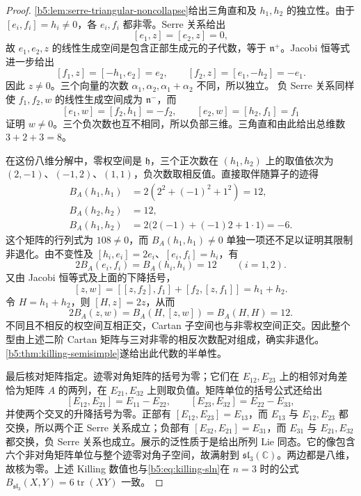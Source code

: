 \begin{proof}
	\cref{b5:lem:serre-triangular-noncollapse}给出三角直和及 \(h_1,h_2\) 的独立性。由于 \([e_i,f_i]=h_i\ne0\)，各 \(e_i,f_i\) 都非零。Serre 关系给出
	\[
		[e_1,z]=[e_2,z]=0,
	\]
	故 \(e_1,e_2,z\) 的线性生成空间是包含正部生成元的子代数，等于 \(\mathfrak n^+\)。Jacobi 恒等式进一步给出
	\[
		[f_1,z]=[-h_1,e_2]=e_2,\qquad [f_2,z]=[e_1,-h_2]=-e_1.
	\]
	因此 \(z\ne0\)。三个向量的次数 \(\alpha_1,\alpha_2,\alpha_1+\alpha_2\) 不同，所以独立。 负 Serre 关系同样使 \(f_1,f_2,w\) 的线性生成空间成为 \(\mathfrak n^-\)，而
	\[
		[e_1,w]=[f_2,h_1]=-f_2,\qquad [e_2,w]=[h_2,f_1]=f_1
	\]
	证明 \(w\ne0\)。三个负次数也互不相同，所以负部三维。三角直和由此给出总维数 \(3+2+3=8\)。

	在这份八维分解中，零权空间是 \(\mathfrak h\)，三个正次数在 \((h_1,h_2)\) 上的取值依次为 \((2,-1)\)、\((-1,2)\)、\((1,1)\)，负次数取相反值。直接取伴随算子的迹得
	\[
		\begin{aligned}
			B_A(h_1,h_1)&=2(2^2+(-1)^2+1^2)=12,\\
			B_A(h_2,h_2)&=12,\\
			B_A(h_1,h_2)&=2\bigl(2(-1)+(-1)2+1\cdot1\bigr)=-6.
		\end{aligned}
	\]
	这个矩阵的行列式为 \(108\ne0\)，而 \(B_A(h_1,h_1)\ne0\) 单独一项还不足以证明其限制非退化。由不变性及 \([h_i,e_i]=2e_i\)、\([e_i,f_i]=h_i\)，有
	\[
		2B_A(e_i,f_i)=B_A(h_i,h_i)=12\qquad(i=1,2).
	\]
	又由 Jacobi 恒等式及上面的下降括号，
	\[
		[z,w]=[[z,f_2],f_1]+[f_2,[z,f_1]]=h_1+h_2.
	\]
	令 \(H=h_1+h_2\)，则 \([H,z]=2z\)，从而
	\[
		2B_A(z,w)=B_A(H,[z,w])=B_A(H,H)=12.
	\]
	不同且不相反的权空间互相正交，Cartan 子空间也与非零权空间正交。因此整个型由上述二阶 Cartan 矩阵与三对非零的相反次数配对组成，确实非退化。\cref{b5:thm:killing-semisimple}遂给出此代数的半单性。

	最后核对矩阵指定。迹零对角矩阵的括号为零；它们在 \(E_{12},E_{23}\) 上的相邻对角差恰为矩阵 \(A\) 的两列，在 \(E_{21},E_{32}\) 上则取负值。矩阵单位的括号公式还给出
	\[
		[E_{12},E_{21}]=E_{11}-E_{22},\qquad [E_{23},E_{32}]=E_{22}-E_{33},
	\]
	并使两个交叉的升降括号为零。正部有 \([E_{12},E_{23}]=E_{13}\)，而 \(E_{13}\) 与 \(E_{12},E_{23}\) 都交换，所以两个正 Serre 关系成立；负部有 \([E_{32},E_{21}]=E_{31}\)，而 \(E_{31}\) 与 \(E_{21},E_{32}\) 都交换，负 Serre 关系也成立。展示的泛性质于是给出所列 Lie 同态。它的像包含六个非对角矩阵单位与整个迹零对角子空间，故满射到 \(\mathfrak{sl}_3(\mathbb C)\)。两边都是八维，故核为零。上述 Killing 数值也与\eqref{b5:eq:killing-sln}在 \(n=3\) 时的公式 \(B_{\mathfrak{sl}_3}(X,Y)=6\operatorname{tr}(XY)\) 一致。
\end{proof}

